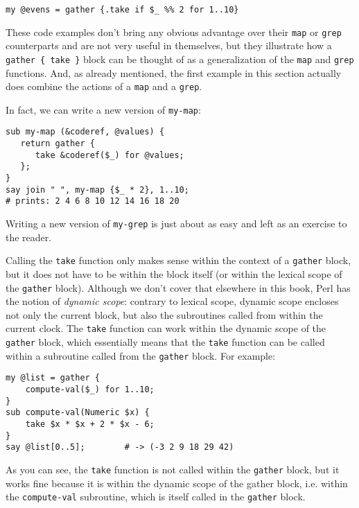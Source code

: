 \begin{verbatim}
my @evens = gather {.take if $_ %% 2 for 1..10}
\end{verbatim}


These code examples don't bring any obvious advantage 
over their \verb'map' or {\tt grep} counterparts and 
are not very useful in themselves, but they illustrate 
how a \verb'gather { take }' block can be thought 
of as a generalization of the \verb'map' and 
{\tt grep} functions. And, as already mentioned, 
the first example in this section actually does combine 
the actions of a {\tt map} and a {\tt grep}.

In fact, we can write a new version of {\tt my-map}:

\begin{verbatim}
sub my-map (&coderef, @values) {
   return gather {
      take &coderef($_) for @values;
   };
}
say join " ", my-map {$_ * 2}, 1..10;
# prints: 2 4 6 8 10 12 14 16 18 20
\end{verbatim}

Writing a new version of {\tt my-grep} is just 
about as easy and left as an exercise to the reader.

Calling the {\tt take} function only makes sense 
within the context of a \verb'gather' block, but 
it does not have to be within the block itself 
(or within the lexical scope of the \verb'gather' 
block). Although we don't cover that elsewhere in this book, 
Perl has the notion of \emph{dynamic scope}: contrary 
to lexical scope, dynamic scope encloses not only 
the current block, but also the subroutines called 
from within the current clock. The {\tt take} function 
can work within the dynamic scope of the \verb'gather' 
block, which essentially means that the {\tt take} 
function can be called within a subroutine called from 
the \verb'gather' block. For example:

\begin{verbatim}
my @list = gather {
    compute-val($_) for 1..10; 
}
sub compute-val(Numeric $x) {
    take $x * $x + 2 * $x - 6;
}
say @list[0..5];        # -> (-3 2 9 18 29 42)
\end{verbatim}

As you can see, the {\tt take} function is not called 
within the {\tt gather} block, but it works fine because 
it is within the dynamic scope of the gather block, i.e. 
within the {\tt compute-val} subroutine, which is itself 
called in the {\tt gather} block.

